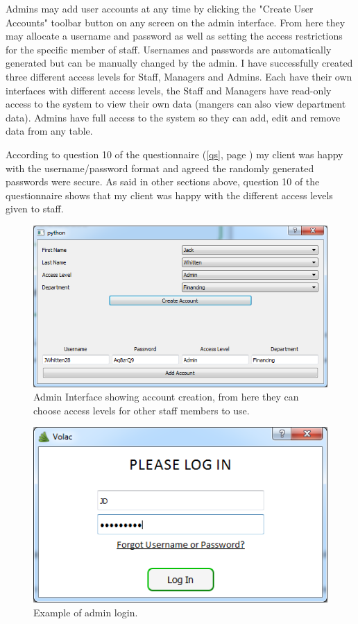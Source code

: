 Admins may add user accounts at any time by clicking the "Create User Accounts" toolbar button on any screen on the admin interface. From here they may allocate a username and password as well as setting the access restrictions for the specific member of staff. Usernames and passwords are automatically generated but can be manually changed by the admin. I have successfully created three different access levels for Staff, Managers and Admins. Each have their own interfaces with different access levels, the Staff and Managers have read-only access to the system to view their own data (mangers can also view department data). Admins have full access to the system so they can add, edit and remove data from any table.

According to question 10 of the questionnaire (\ref{qs}, page \pageref{qs}) my client was happy with the username/password format and agreed the randomly generated passwords were secure. As said in other sections above, question 10 of the questionnaire shows that my client was happy with the different access levels given to staff.


\begin{figure}[H]
    \includegraphics[width=\textwidth]{./Evaluation/Images/login1.png}
    \caption{Admin Interface showing account creation, from here they can choose access levels for other staff members to use.} 
\end{figure}

\begin{figure}[H]
    \includegraphics[width=\textwidth]{./Evaluation/Images/login2.png}
    \caption{Example of admin login.} 
\end{figure}

